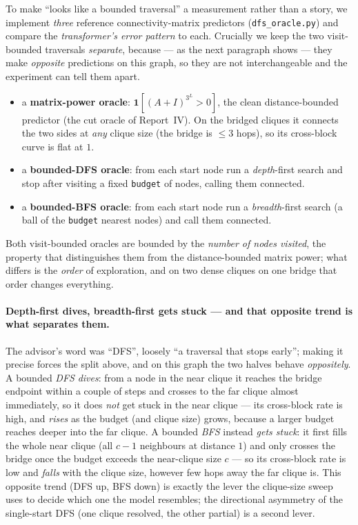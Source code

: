 \documentclass[11pt,a4paper]{article}
\begin{document}
To make ``looks like a bounded traversal'' a measurement rather than a story, we implement
\emph{three} reference connectivity-matrix predictors (\texttt{dfs\_oracle.py}) and compare the
\emph{transformer's error pattern} to each. Crucially we keep the two visit-bounded traversals
\emph{separate}, because --- as the next paragraph shows --- they make \emph{opposite} predictions
on this graph, so they are not interchangeable and the experiment can tell them apart.
\begin{itemize}\setlength\itemsep{0.1em}
  \item a \textbf{matrix-power oracle}: $\mathbf{1}[(A+I)^{3^L}>0]$, the clean distance-bounded
        predictor (the cut oracle of Report~IV). On the bridged cliques it connects the two
        sides at \emph{any} clique size (the bridge is $\le 3$ hops), so its cross-block curve
        is flat at $1$.
  \item a \textbf{bounded-DFS oracle}: from each start node run a \emph{depth}-first search and
        stop after visiting a fixed \texttt{budget} of nodes, calling them connected.
  \item a \textbf{bounded-BFS oracle}: from each start node run a \emph{breadth}-first search
        (a ball of the \texttt{budget} nearest nodes) and call them connected.
\end{itemize}
Both visit-bounded oracles are bounded by the \emph{number of nodes visited}, the property that
distinguishes them from the distance-bounded matrix power; what differs is the \emph{order} of
exploration, and on two dense cliques on one bridge that order changes everything.

\paragraph{Depth-first dives, breadth-first gets stuck --- and that opposite trend is what
separates them.} The advisor's word was ``DFS'', loosely ``a traversal that stops early''; making
it precise forces the split above, and on this graph the two halves behave \emph{oppositely}. A
bounded \emph{DFS} \emph{dives}: from a node in the near clique it reaches the bridge endpoint
within a couple of steps and crosses to the far clique almost immediately, so it does \emph{not}
get stuck in the near clique --- its cross-block rate is high, and \emph{rises} as the budget (and
clique size) grows, because a larger budget reaches deeper into the far clique. A bounded
\emph{BFS} instead \emph{gets stuck}: it first fills the whole near clique (all $c-1$ neighbours at
distance $1$) and only crosses the bridge once the budget exceeds the near-clique size $c$ --- so
its cross-block rate is low and \emph{falls} with the clique size, however few hops away the far
clique is. This opposite trend (DFS up, BFS down) is exactly the lever the clique-size sweep uses
to decide which one the model resembles; the directional asymmetry of the single-start DFS (one
clique resolved, the other partial) is a second lever.
\end{document}
